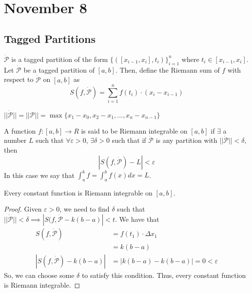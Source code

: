 \section{November 8}

\subsection{Tagged Partitions}
\begin{definition}
    $\dot{\mathcal{P}}$ is a tagged partition of the form $\{([x_{i - 1}, x_i], t_i)\}_{i = 1}^n$ where $t_i \in [x_{i - 1}, x_i]$. Let $\dot{\mathcal{P}}$ be a tagged partition of $[a, b]$. Then, define the Riemann sum of $f$ with respect to $\dot{\mathcal{P}}$ on $[a, b]$ as $$S(f, \dot{\mathcal{P}}) = \sum_{i = 1}^n f(t_i) \cdot (x_i - x_{i - 1})$$
\end{definition}
\begin{remark}
    $||\dot{\mathcal{P}}|| = ||\mathcal{P}|| = \max\{x_1 - x_0, x_2 - x_1, \ldots, x_n - x_{n - 1}\}$
\end{remark}

\begin{definition}
    A function $f: [a, b] \to R$ is said to be Riemann integrable on $[a, b]$ if $\exists$ a number $L$ such that $\forall \varepsilon > 0$, $\exists \delta > 0$ such that if $\dot{\mathcal{P}}$ is any partition with $||\dot{\mathcal{P}}|| < \delta$, then $$\left| S(f, \dot{\mathcal{P}}) - L \right| < \varepsilon$$
    In this case we say that $\int_a^b f = \int_a^b f(x) dx = L$.
\end{definition}

\begin{theorem}
    Every constant function is Riemann integrable on $[a, b]$.
\end{theorem}
\begin{proof}
    Given $\varepsilon > 0$, we need to find $\delta$ such that $||\dot{\mathcal{P}}|| < \delta \implies |S(f, \dot{\mathcal{P}} - k(b - a)| < t$. We have that
    \begin{align*}
        S(f, \dot{\mathcal{P}}) &= f(t_1) \cdot \Delta x_1 \\
        &= k(b - a) \\
        |S(f, \dot{\mathcal{P}}) - k(b - a)| &= |k(b - a) - k(b - a)| = 0 < \varepsilon
    \end{align*}
    So, we can choose some $\delta$ to satisfy this condition. Thus, every constant function is Riemann integrable.
\end{proof}

